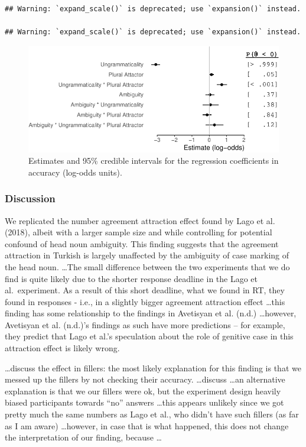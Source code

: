 \documentclass[english,doc]{apa6}
\begin{document}
\begin{verbatim}
## Warning: `expand_scale()` is deprecated; use `expansion()` instead.

## Warning: `expand_scale()` is deprecated; use `expansion()` instead.
\end{verbatim}

\begin{figure}
\centering
\includegraphics{paper_draft_files/figure-latex/exp1ResponseModelPlot-1.pdf}
\caption{\label{fig:exp1ResponseModelPlot}Estimates and 95\% credible intervals for the regression coefficients in accuracy (log-odds units).}
\end{figure}

\hypertarget{discussion}{%
\subsubsection{Discussion}\label{discussion}}

We replicated the number agreement attraction effect found by Lago et al. (2018), albeit with a larger sample size and while controlling for potential confound of head noun ambiguity. This finding suggests that the agreement attraction in Turkish is largely unaffected by the ambiguity of case marking of the head noun.
\ldots The small difference between the two experiments that we do find is quite likely due to the shorter response deadline in the Lago et al.~experiment. As a result of this short deadline, what we found in RT, they found in responses - i.e., in a slightly bigger agreement attraction effect
\ldots this finding has some relationship to the findings in Avetisyan et al. (n.d.)
\ldots however, Avetisyan et al. (n.d.)'s findings as such have more predictions -- for example, they predict that Lago et al.'s speculation about the role of genitive case in this attraction effect is likely wrong.

\ldots discuss the effect in fillers: the most likely explanation for this finding is that we messed up the fillers by not checking their accuracy. \ldots discuss
\ldots an alternative explanation is that we our fillers were ok, but the experiment design heavily biased participants towards \enquote{no} answers \ldots this appears unlikely since we got pretty much the same numbers as Lago et al., who didn't have such fillers (as far as I am aware) \ldots however, in case that is what happened, this does not change the interpretation of our finding, because \ldots
\end{document}
